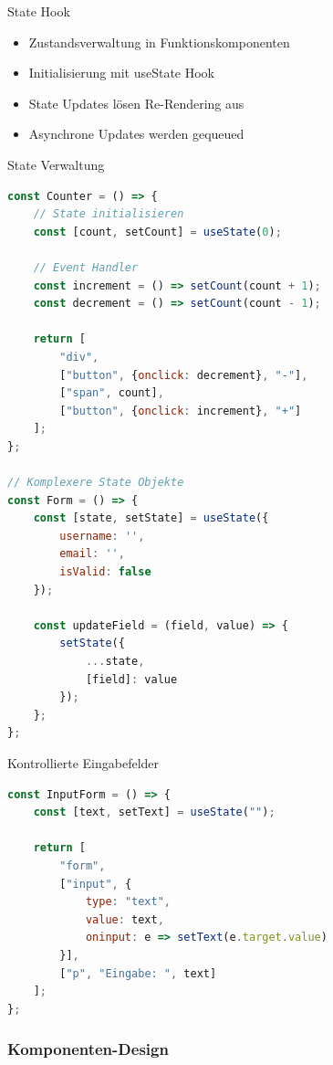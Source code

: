 \begin{concept}{State Hook}
    \begin{itemize}
        \item Zustandsverwaltung in Funktionskomponenten
        \item Initialisierung mit useState Hook
        \item State Updates lösen Re-Rendering aus
        \item Asynchrone Updates werden gequeued
    \end{itemize}
\end{concept}

\begin{KR}{State Verwaltung}
\begin{lstlisting}[language=JavaScript, style=basesmol]
const Counter = () => {
    // State initialisieren
    const [count, setCount] = useState(0);
    
    // Event Handler
    const increment = () => setCount(count + 1);
    const decrement = () => setCount(count - 1);
    
    return [
        "div",
        ["button", {onclick: decrement}, "-"],
        ["span", count],
        ["button", {onclick: increment}, "+"]
    ];
};

// Komplexere State Objekte
const Form = () => {
    const [state, setState] = useState({
        username: '',
        email: '',
        isValid: false
    });
    
    const updateField = (field, value) => {
        setState({
            ...state,
            [field]: value
        });
    };
};
\end{lstlisting}
\end{KR}

\begin{KR}{Kontrollierte Eingabefelder}
\begin{lstlisting}[language=JavaScript, style=basesmol]
const InputForm = () => {
    const [text, setText] = useState("");
    
    return [
        "form",
        ["input", {
            type: "text",
            value: text,
            oninput: e => setText(e.target.value)
        }],
        ["p", "Eingabe: ", text]
    ];
};
\end{lstlisting}
\end{KR}

\subsubsection{Komponenten-Design}

